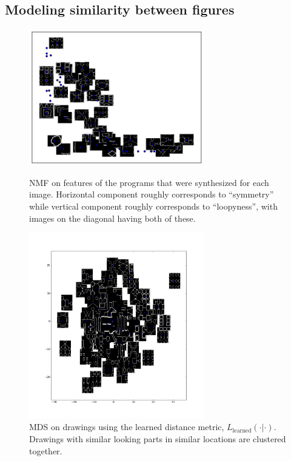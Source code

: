 \documentclass{article}
\begin{document}
\subsection{Modeling similarity between figures}

\begin{figure}
  \begin{minipage}{0.4\textwidth}
  \includegraphics[width = 3in]{figures/NMF.png}
  \caption{NMF on features of the programs that were synthesized for each image. Horizontal component roughly corresponds to ``symmetry'' while vertical component roughly corresponds to ``loopyness'', with images on the diagonal having both of these.}    
    \end{minipage}\hfill
\begin{minipage}{0.4\textwidth}
  \includegraphics[width = 3in]{figures/imageSimilarity.png} 
  \caption{MDS on drawings using the learned distance metric, $L_{\text{learned}}(\cdot|\cdot)$. Drawings with similar looking parts in similar locations are clustered together.}
    \end{minipage}
  \end{figure}
\end{document}
